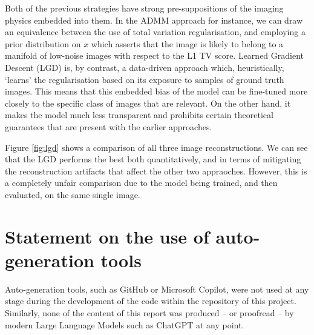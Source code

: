 \documentclass[12pt]{article}
\begin{document}
Both of the previous strategies have strong pre-suppositions of the imaging physics embedded into them.
In the ADMM approach for instance, we can draw an equivalence between the use of total variation regularisation,
and employing a prior distribution on $x$ which asserts that the image is likely to belong to a manifold of low-noise images with respect to the L1 TV score.
Learned Gradient Descent (LGD) is, by contrast, a data-driven approach which, heuristically, `learns' the regularisation based on its exposure to samples of ground truth images.
This means that this embedded bias of the model can be fine-tuned more closely to the specific class of images that are relevant.
On the other hand, it makes the model much less transparent and prohibits certain theoretical guarantees that are present with the earlier approaches.

Figure \ref{fig:lgd} shows a comparison of all three image reconstructions.
We can see that the LGD performs the best both quantitatively,
and in terms of mitigating the reconstruction artifacts that affect the other two appraoches.
However, this is a completely unfair comparison due to the model being trained, and then evaluated, on the same single image.




\appendix

\section{Statement on the use of auto-generation tools}

Auto-generation tools, such as GitHub or Microsoft Copilot, were not used at any stage during the development of the code within the repository of this project.
Similarly, none of the content of this report was produced -- or proofread -- by modern Large Language Models such as ChatGPT at any point.
\end{document}

